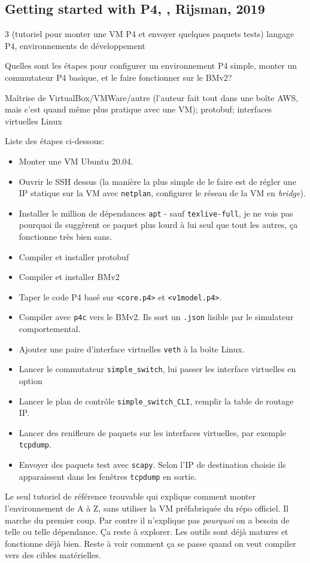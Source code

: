 
\subsection{Getting started with P4, \cite{rijsman_getting_2019}, Rijsman, 2019}
 3 (tutoriel pour monter une VM P4 et envoyer quelques paquets tests)
 langage P4, environnements de développement

 Quelles sont les étapes pour configurer un environnement P4 simple, monter un commutateur P4 basique, et le faire fonctionner sur le BMv2?

 Maîtrise de VirtualBox/VMWare/autre \cite{noauthor_oracle_2004} (l'auteur fait tout dans une boîte AWS, mais c'est quand même plus pratique avec une VM); protobuf; interfaces virtuelles Linux

 Liste des étapes ci-dessous:


\begin{itemize}
	\item Monter une VM Ubuntu 20.04.
	\item Ouvrir le SSH dessus (la manière la plus simple de le faire est de régler une IP statique sur la VM avec \texttt{netplan}, configurer le réseau de la VM en \emph{bridge}).
	\item Installer le million de dépendances \texttt{apt} - sauf \texttt{texlive-full}, je ne vois pas pourquoi ils suggèrent ce paquet plus lourd à lui seul que tout les autres, ça fonctionne très bien sans.
	\item Compiler et installer protobuf
	\item Compiler et installer BMv2
	\item Taper le code P4 basé sur \texttt{<core.p4>} et \texttt{<v1model.p4>}.
	\item Compiler avec \texttt{p4c} vers le BMv2. Ils sort un \texttt{.json} lisible par le simulateur comportemental.
	\item Ajouter une paire d'interface virtuelles \texttt{veth} à la boîte Linux.
	\item Lancer le commutateur \texttt{simple\_switch}, lui passer les interface virtuelles en option
	\item Lancer le plan de contrôle \texttt{simple\_switch\_CLI}, remplir la table de routage IP.
	\item Lancer des renifleurs de paquets sur les interfaces virtuelles, par exemple \texttt{tcpdump}.
	\item Envoyer des paquets test avec \texttt{scapy}. Selon l'IP de destination choisie ils apparaissent dans les fenêtres \texttt{tcpdump} en sortie.
\end{itemize}

 Le seul tutoriel de référence trouvable qui explique comment monter l'environnement de A à Z, sans utiliser la VM préfabriquée du répo officiel. Il marche du premier coup. Par contre il n'explique pas \emph{pourquoi} on a besoin de telle ou telle dépendance. Ça reste à explorer. Les outils sont déjà matures et fonctionne déjà bien. Reste à voir comment ça se passe quand on veut compiler vers des cibles matérielles.
\clearpage
